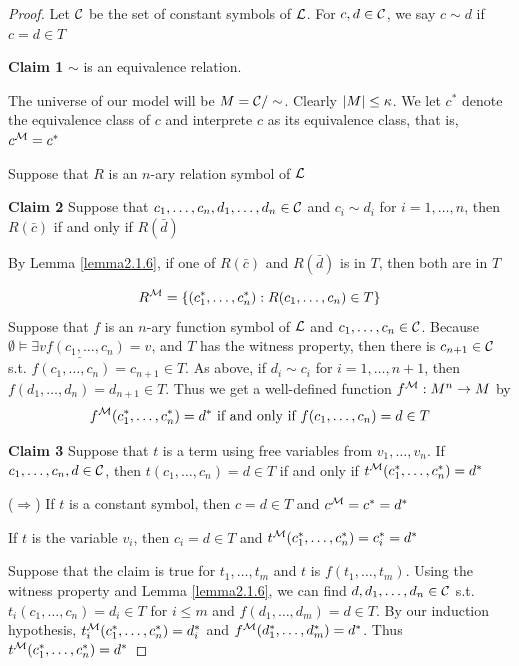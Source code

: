 \documentclass[11pt]{article}
\begin{document}
\begin{proof}
Let \(\mathcal{C}\) be the set of constant symbols of \(\mathcal{L}\). For \(c,d\in\mathcal{C}\),
we say \(c\sim d\) if \(c=d\in T\)

\textbf{Claim 1} \(\sim\) is an equivalence relation. 

The universe of our model will be \(M=\mathcal{C}/\sim\). Clearly
\(\abs{M}\le\kappa\). We let \(c^*\) denote the equivalence class of \(c\) and
interprete \(c\) as its equivalence class, that is, \(c^{\mathcal{M}}=c^*\)

Suppose that \(R\) is an \(n\)-ary relation symbol of \(\mathcal{L}\)

\textbf{Claim 2} Suppose that \(c_1,\dots,c_n,d_1,\dots,d_n\in\mathcal{C}\) and \(c_i\sim d_i\)
for \(i=1,\dots,n\), then \(R(\bar{c})\) if and only if \(R(\bar{d})\)

By Lemma \ref{lemma2.1.6}, if one of \(R(\bar{c})\) and \(R(\bar{d})\) is
in \(T\), then both are in \(T\)


\begin{equation*}
R^{\mathcal{M}}=\{(c_1^*,\dots,c_n^*):R(c_1,\dots,c_n)\in T\}
\end{equation*}
Suppose that \(f\) is an \(n\)-ary function symbol of \(\mathcal{L}\) and
\(c_1,\dots,c_n\in\mathcal{C}\). Because  \(\underline{\emptyset\vDash\exists
    vf(c_1,\dots,c_n)=v}\), and \(T\) has the witness property, then there is
\(c_{n+1}\in\mathcal{C}\) s.t. \(f(c_1,\dots,c_n)=c_{n+1}\in T\). As above, if
\(d_i\sim c_i\) for \(i=1,\dots,n+1\), then \(f(d_1,\dots,d_n)=d_{n+1}\in T\).
Thus we get a well-defined function \(f^{\mathcal{M}}:M^n\to M\) by
\begin{equation*}
f^{\mathcal{M}}(c_1^*,\dots,c_n^*)=d^*\text{ if and only if }f(c_1,\dots,c_n)=d\in T
\end{equation*}

\textbf{Claim 3} Suppose that \(t\) is a term using free variables from
\(v_1,\dots,v_n\). If \(c_1,\dots,c_n,d\in\mathcal{C}\), then \(t(c_1,\dots,c_n)=d\in
    T\) if and only if \(t^{\mathcal{M}}(c_1^*,\dots,c_n^*)=d^*\)

(\(\Rightarrow\)) If \(t\) is a constant symbol, then \(c=d\in T\) and
\(c^{\mathcal{M}}=c^*=d^*\)

If \(t\) is the variable \(v_i\), then \(c_i=d\in T\) and 
\(t^{\mathcal{M}}(c_1^*,\dots,c_n^*)=c_i^*=d^*\)

Suppose that the claim is true for \(t_1,\dots,t_m\) and \(t\) is
\(f(t_1,\dots,t_m)\). Using the witness property and Lemma \ref{lemma2.1.6},
we can find \(d,d_1,\dots,d_n\in\mathcal{C}\) s.t. \(t_i(c_1,\dots,c_n)=d_i\in T\)
for \(i\le m\) and \(f(d_1,\dots,d_m)=d\in T\). By our induction hypothesis, 
\(t_i^{\mathcal{M}}(c_1^*,\dots,c_n^*)=d_i^*\) and
\(f^{\mathcal{M}}(d_1^*,\dots,d_m^*)=d^*\). Thus \(t^{\mathcal{M}}(c_1^*,\dots,c_n^*)=d^*\)


\end{proof}
\end{document}
